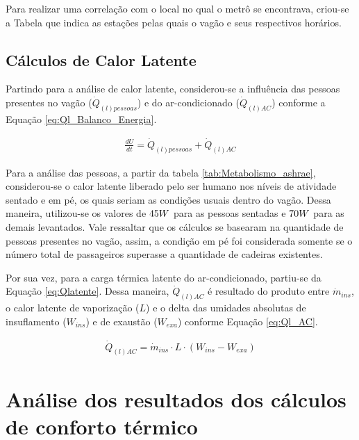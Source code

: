 \documentclass[acronym,symbols,table]{fei}
\begin{document}
Para realizar uma correlação com o local no qual o metrô se encontrava, criou-se a Tabela que indica as estações pelas quais o vagão e seus respectivos horários. 




\subsection{Cálculos de Calor Latente}

Partindo para a análise de calor latente, considerou-se a influência das pessoas presentes no vagão ($\dot{Q}_{(l)pessoas}$) e do ar-condicionado ($\dot{Q}_{(l)AC}$) conforme a Equação \ref{eq:Ql_Balanco_Energia}.

\begin{equation} \label{eq:Ql_Balanco_Energia}
    \begin{aligned}
    \frac{dU}{dt}=\dot{Q}_{(l)pessoas} + \dot{Q}_{(l)AC}
    \end{aligned}
\end{equation}

Para a análise das pessoas, a partir da tabela \ref{tab:Metabolismo_ashrae}, considerou-se o calor latente liberado pelo ser humano nos níveis de atividade sentado e em pé, os quais seriam as condições usuais dentro do vagão. Dessa maneira, utilizou-se os valores de $45 \space W$ para as pessoas sentadas e $70 \space W$ para as demais levantados. Vale ressaltar que os cálculos se basearam na quantidade de pessoas presentes no vagão, assim, a condição em pé foi considerada somente se o número total de passageiros superasse a quantidade de cadeiras existentes.

Por sua vez, para a carga térmica latente do ar-condicionado, partiu-se da Equação \ref{eq:Qlatente}. Dessa maneira, $\dot{Q}_{(l)AC}$ é resultado do produto entre $\dot{m}_{ins}$, o calor latente de vaporização ($L$) e o delta das umidades absolutas de insuflamento ($W_{ins}$) e de exaustão ($W_{exa}$) conforme Equação \ref{eq:Ql_AC}.

\begin{equation} \label{eq:Ql_AC}
    \begin{aligned}
    \dot{Q}_{(l)AC}=\dot{m}_{ins} \cdot L \cdot (W_{ins}-W_{exa})
    \end{aligned}
\end{equation} 
 
\section{Análise dos resultados dos cálculos de conforto térmico} \label{termico}
\end{document}
